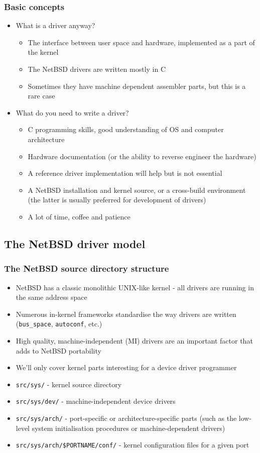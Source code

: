 \documentclass[dvipsnames,table]{beamer}
\begin{document}
\begin{frame}
\frametitle{Basic concepts}
\begin{itemize}
	\item What is a driver anyway?
	\begin{itemize}
		\item The interface between user space and hardware, implemented as a part of the kernel
		\item The NetBSD drivers are written mostly in C
		\item Sometimes they have machine dependent assembler parts, but this is a rare case
	\end{itemize}
	\item What do you need to write a driver?
	\begin{itemize}
		\item C programming skills, good understanding of OS and computer architecture
		\item Hardware documentation (or the ability to reverse engineer the hardware)
		\item A reference driver implementation will help but is not essential
		\item A NetBSD installation and kernel source, or a cross-build environment (the latter is usually preferred for development of drivers)
		\item A lot of time, coffee and patience {\Large \smiley}

	\end{itemize}
\end{itemize}
\end{frame}

\subsection{The NetBSD driver model}

\begin{frame}
\frametitle{The NetBSD source directory structure}
\begin{itemize}
	\item NetBSD has a classic monolithic UNIX-like kernel - all drivers are running in the same address space
	\item Numerous in-kernel frameworks standardise the way drivers are written ({\tt bus\_space}, {\tt autoconf}, etc.) 
	\item High quality, machine-independent (MI) drivers are an important factor that adds to NetBSD portability
	\item We'll only cover kernel parts interesting for a device driver programmer
	\item {\tt src/sys/} - kernel source directory
	\item {\tt src/sys/dev/} - machine-independent device drivers
	\item {\tt src/sys/arch/} - port-specific or architecture-specific parts (such as the low-level system initialisation procedures or machine-dependent drivers)
	\item {\tt src/sys/arch/\$PORTNAME/conf/} - kernel configuration files for a given port

\end{itemize}
\end{frame}
\end{document}
